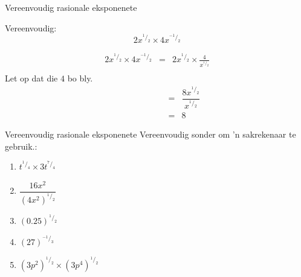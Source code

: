 \begin{wex}
{%
Vereenvoudig rasionale eksponenete 
}

{
Vereenvoudig:
$$ 2x^{^1/_2} \times 4x^{^{-1}/_{2}} $$
}
{%
\begin{eqnarray*}
 2x^{^1/_2} \times 4x^{^{-1}/_{2}} & = & 2x^{^1/_2} \times \frac{4}{x^{^1/_2}} \\
\end{eqnarray*}
Let op dat die $4$ bo bly.\\

\begin{eqnarray*}
 \phantom{2x^{^1/_2} \times 4x^{^{-1}/_{2}}} & = & \dfrac{8x^{^1/_2}}{x^{^1/_2}} \\
					     & = & 8
\end{eqnarray*}


}
\end{wex}

\begin{exercises}{Vereenvoudig rasionale eksponenete}
Vereenvoudig sonder om ’n sakrekenaar te gebruik.:
\begin{multicols}{2}
\begin{enumerate}[noitemsep, label=\textbf{\arabic*}., itemsep=5pt]
 \item $ t^{^1/_4} \times 3t^{^7/_4} $
 \item $ \dfrac{16x^2}{(4x^2)^{^1/_2}} $
 \item $ (0.25)^{^1/_2} $
 \item $ (27)^{^{-1}/_3} $
 \item $ (3p^2)^{^1/_2} \times (3p^4)^{^1/_2} $
\end{enumerate}
\end{multicols}

 






\end{exercises}



